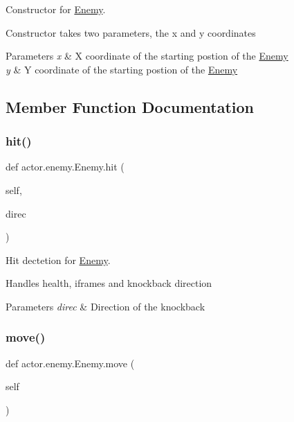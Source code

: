 Constructor for \hyperlink{classactor_1_1enemy_1_1_enemy}{Enemy}. 

Constructor takes two parameters, the x and y coordinates 
\begin{DoxyParams}{Parameters}
{\em x} & X coordinate of the starting postion of the \hyperlink{classactor_1_1enemy_1_1_enemy}{Enemy} \\
\hline
{\em y} & Y coordinate of the starting postion of the \hyperlink{classactor_1_1enemy_1_1_enemy}{Enemy} \\
\hline
\end{DoxyParams}


\subsection{Member Function Documentation}
\mbox{\label{classactor_1_1enemy_1_1_enemy_a26b704148d13a372e1bf150937e30673}} 
\subsubsection{\texorpdfstring{hit()}{hit()}}
{\footnotesize\ttfamily def actor.\+enemy.\+Enemy.\+hit (\begin{DoxyParamCaption}\item[{}]{self,  }\item[{}]{direc }\end{DoxyParamCaption})}



Hit dectetion for \hyperlink{classactor_1_1enemy_1_1_enemy}{Enemy}. 

Handles health, iframes and knockback direction 
\begin{DoxyParams}{Parameters}
{\em direc} & Direction of the knockback \\
\hline
\end{DoxyParams}
\mbox{\label{classactor_1_1enemy_1_1_enemy_acae64f8e1e7e13ee7c440c74e3c214c8}} 
\subsubsection{\texorpdfstring{move()}{move()}}
{\footnotesize\ttfamily def actor.\+enemy.\+Enemy.\+move (\begin{DoxyParamCaption}\item[{}]{self }\end{DoxyParamCaption})}



